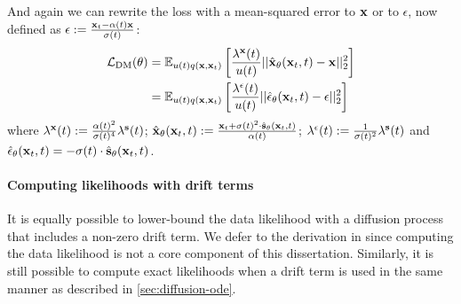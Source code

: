 And again we can rewrite the loss with a mean-squared error to ${\mathbf{x}}$ or to $\epsilon$, now defined as $\epsilon := \frac{{\mathbf{x}}_t-\alpha(t){\mathbf{x}}}{\sigma(t)}$:
\begin{align}
    \mathcal{L}_\text{DM}(\theta) &= \mathbb{E}_{u(t)q({\mathbf{x}}, {\mathbf{x}}_t)} \left[ \frac{\lambda^{\mathbf{x}}(t)}{u(t)} || \hat{{\mathbf{x}}}_\theta({\mathbf{x}}_t, t) - {\mathbf{x}} ||_2^2 \right] \label{eq:diffusion-general-x-prediction} \\
     &= \mathbb{E}_{u(t)q({\mathbf{x}}, {\mathbf{x}}_t)} \left[ \frac{\lambda^\epsilon(t)}{u(t)} || \hat{\mathbf{\epsilon}}_\theta({\mathbf{x}}_t, t) - \epsilon ||_2^2 \right] \label{eq:diffusion-general-epsilon-prediction}
\end{align}
where $\lambda^{\mathbf{x}}(t) := \frac{\alpha(t)^2}{\sigma(t)^4}\lambda^{\mathbf{s}}(t)$; $\hat{{\mathbf{x}}}_\theta({\mathbf{x}}_t, t) := \frac{{\mathbf{x}}_t + \sigma(t)^2 \cdot \hat{{\mathbf{s}}}_\theta({\mathbf{x}}_t, t)}{\alpha(t)}$; $\lambda^\epsilon(t) := \frac{1}{\sigma(t)^2} \lambda^{\mathbf{s}}(t)$ and $\hat{\mathbf{\epsilon}}_\theta({\mathbf{x}}_t, t) = - \sigma(t) \cdot \hat{{\mathbf{s}}}_\theta({\mathbf{x}}_t, t)$.

\paragraph{Computing likelihoods with drift terms}
It is equally possible to lower-bound the data likelihood with a diffusion process that includes a non-zero drift term. We defer to the derivation in \citet{kingma2021variational} since computing the data likelihood is not a core component of this dissertation. Similarly, it is still possible to compute exact likelihoods when a drift term is used in the same manner as described in \cref{sec:diffusion-ode}.